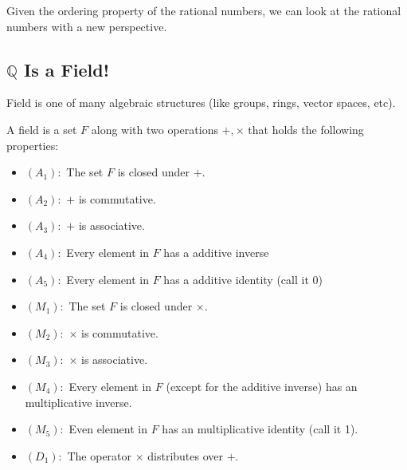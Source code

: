 Given the ordering property of the rational numbers, we can look at the rational numbers with a new perspective.


\subsection{$ \mathbb{Q} $ Is a Field!}
Field is one of many algebraic structures (like groups, rings, vector spaces, etc). 

\begin{definition}[Field]
	A field is a set $ F $ along with two operations $ +, \times $ that holds the following properties:
	\begin{itemize}
		\item $ (A_1): $ The set $ F $ is closed under $ + $. 
		\item $ (A_2): $ $ + $ is commutative.
		\item $ (A_3): $ $ + $ is associative.
		\item $ (A_4): $ Every element in $ F $ has a additive inverse
		\item $ (A_5): $ Every element in $ F $ has a additive identity (call it 0)
		\item $ (M_1): $ The set $ F $ is closed under $ \times $.
		\item $ (M_2): $ $ \times $ is commutative.
		\item $ (M_3): $ $ \times $ is associative.
		\item $ (M_4): $ Every element in $ F $ (except for the additive inverse) has an multiplicative inverse.
		\item $ (M_5): $ Even element in $ F $ has an multiplicative identity (call it 1).
		\item $ (D_1): $ The operator $ \times $ distributes over $ + $.
	\end{itemize}
\end{definition}

